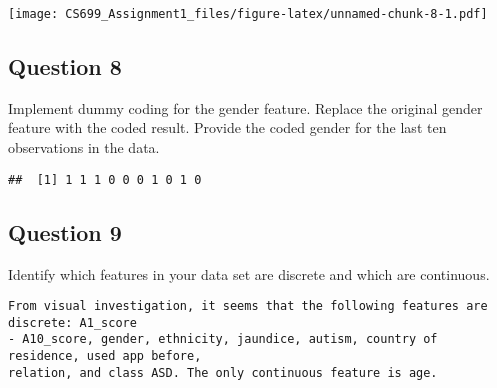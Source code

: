 \documentclass[
]{article}
\newenvironment{Shaded}{\begin{snugshade}}{\end{snugshade}}
\newcommand{\AttributeTok}[1]{\textcolor[rgb]{0.13,0.29,0.53}{#1}}
\newcommand{\CommentTok}[1]{\textcolor[rgb]{0.56,0.35,0.01}{\textit{#1}}}
\newcommand{\ConstantTok}[1]{\textcolor[rgb]{0.56,0.35,0.01}{#1}}
\newcommand{\DecValTok}[1]{\textcolor[rgb]{0.00,0.00,0.81}{#1}}
\newcommand{\FunctionTok}[1]{\textcolor[rgb]{0.13,0.29,0.53}{\textbf{#1}}}
\newcommand{\NormalTok}[1]{#1}
\newcommand{\OtherTok}[1]{\textcolor[rgb]{0.56,0.35,0.01}{#1}}
\newcommand{\SpecialCharTok}[1]{\textcolor[rgb]{0.81,0.36,0.00}{\textbf{#1}}}
\newcommand{\StringTok}[1]{\textcolor[rgb]{0.31,0.60,0.02}{#1}}
\begin{document}
\texttt{[image: CS699\_Assignment1\_files/figure-latex/unnamed-chunk-8-1.pdf]}

\subsection{Question 8}\label{question-8}

Implement dummy coding for the gender feature. Replace the original
gender feature with the coded result. Provide the coded gender for the
last ten observations in the data.

\begin{Shaded}
\end{Shaded}

\begin{verbatim}
##  [1] 1 1 1 0 0 0 1 0 1 0
\end{verbatim}

\subsection{Question 9}\label{question-9}

Identify which features in your data set are discrete and which are
continuous.

\begin{verbatim}
From visual investigation, it seems that the following features are discrete: A1_score
- A10_score, gender, ethnicity, jaundice, autism, country of residence, used app before,
relation, and class ASD. The only continuous feature is age.
\end{verbatim}
\end{document}
